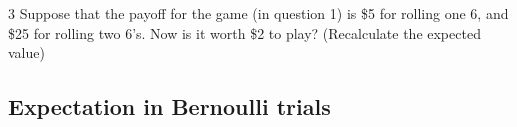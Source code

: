 \documentclass[a4paper,12pt]{book}
\newcounter{question}
\begin{document}
        \begin{question}{\thequestion}{3}
            Suppose that the payoff for the game (in question 1) is \$5
            for rolling one 6, and \$25 for rolling two 6's. Now is it worth \$2 to play?
            (Recalculate the expected value)

        \end{question}

        \notonkey{ \newpage }{ \hrulefill }
        
        \subsection{Expectation in Bernoulli trials}
\end{document}
